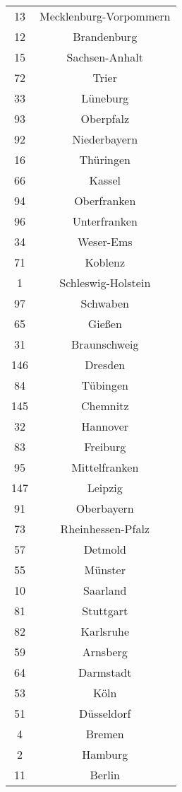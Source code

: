 \begin{tabular}{c c}
    13&Mecklenburg-Vorpommern\\ 
    12&Brandenburg\\ 
    15&Sachsen-Anhalt\\ 
    72&Trier\\ 
    33&Lüneburg\\ 
    93&Oberpfalz\\ 
    92&Niederbayern\\ 
    16&Thüringen\\ 
    66&Kassel\\ 
    94&Oberfranken\\ 
    96&Unterfranken\\ 
    34&Weser-Ems\\ 
    71&Koblenz\\ 
    1&Schleswig-Holstein\\ 
    97&Schwaben\\ 
    65&Gießen\\ 
    31&Braunschweig\\ 
    146&Dresden\\ 
    84&Tübingen\\ 
    145&Chemnitz\\ 
    32&Hannover\\ 
    83&Freiburg\\ 
    95&Mittelfranken\\ 
    147&Leipzig\\ 
    91&Oberbayern\\ 
    73&Rheinhessen-Pfalz\\ 
    57&Detmold\\ 
    55&Münster\\ 
    10&Saarland\\ 
    81&Stuttgart\\ 
    82&Karlsruhe\\ 
    59&Arnsberg\\ 
    64&Darmstadt\\ 
    53&Köln\\ 
    51&Düsseldorf\\ 
    4&Bremen\\ 
    2&Hamburg\\ 
    11&Berlin\\ 

\end{tabular}